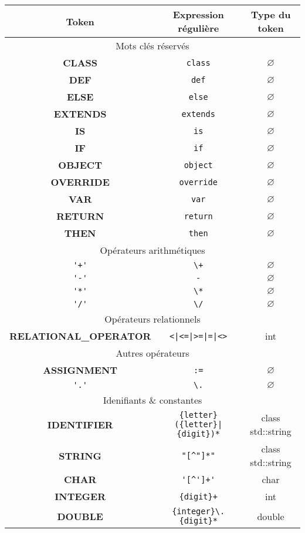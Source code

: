 \documentclass[12pt,a4paper]{article}
\begin{document}
\begin{center}
	\sffamily
	\begin{tabular}{|c|c|c|}
		\hline
		Token & Expression régulière & Type du token \tabularnewline
		\hline \hline
		\multicolumn{3}{|c|}{Mots clés réservés} \tabularnewline		
		\hline
		\textbf{CLASS}    & \verb|class|    & $\varnothing$ \tabularnewline
		\hline
		\textbf{DEF}      & \verb|def|      & $\varnothing$ \tabularnewline
		\hline
		\textbf{ELSE}     &  \verb|else|    & $\varnothing$ \tabularnewline
		\hline
		\textbf{EXTENDS}  & \verb|extends|  & $\varnothing$ \tabularnewline
		\hline
		\textbf{IS}       & \verb|is|       & $\varnothing$ \tabularnewline
		\hline
		\textbf{IF}       & \verb|if|       & $\varnothing$ \tabularnewline
		\hline
		\textbf{OBJECT}   & \verb|object|   & $\varnothing$ \tabularnewline
		\hline
		\textbf{OVERRIDE} & \verb|override| & $\varnothing$ \tabularnewline
		\hline
		\textbf{VAR}      & \verb|var|      & $\varnothing$ \tabularnewline
		\hline
		\textbf{RETURN}   & \verb|return|   & $\varnothing$ \tabularnewline
		\hline
		\textbf{THEN}     & \verb|then|     & $\varnothing$ \tabularnewline
		\hline \hline
		\multicolumn{3}{|c|}{Opérateurs arithmétiques} \tabularnewline
		\hline
		\verb|'+'| & \verb|\+| & $\varnothing$ \tabularnewline
		\verb|'-'| & \verb|-|  & $\varnothing$ \tabularnewline
		\verb|'*'| & \verb|\*| & $\varnothing$ \tabularnewline
		\verb|'/'| & \verb|\/| & $\varnothing$ \tabularnewline
		\hline \hline
		\multicolumn{3}{|c|}{Opérateurs relationnels} \tabularnewline
		\hline
		\textbf{RELATIONAL\_OPERATOR} & \verb!<|<=|>=|=|<>! & {\color{blue}int} \tabularnewline
		\hline \hline
		\multicolumn{3}{|c|}{Autres opérateurs} \tabularnewline
		\hline
		\textbf{ASSIGNMENT}     & \verb|:=| & $\varnothing$ \tabularnewline
		\verb|'.'| & \verb|\.|  & $\varnothing$ \tabularnewline
		\hline \hline
		\multicolumn{3}{|c|}{Idenifiants \& constantes} \tabularnewline
		\hline
		\textbf{IDENTIFIER} & \verb/{letter}({letter}|{digit})*/ & {\color{blue}class} {\color{turquoise}std}::{\color{turquoise}string} \tabularnewline
		\textbf{STRING}     & \verb|"[^"]*"|                     & {\color{blue}class} {\color{turquoise}std}::{\color{turquoise}string} \tabularnewline
		\textbf{CHAR}       & \verb|'[^']+'|             & {\color{blue}char}   \tabularnewline		
		\textbf{INTEGER}    & \verb|{digit}+|            & {\color{blue}int}    \tabularnewline
		\textbf{DOUBLE}     & \verb|{integer}\.{digit}*| & {\color{blue}double} \tabularnewline
		\hline
	\end{tabular}
\end{center}
\end{document}
